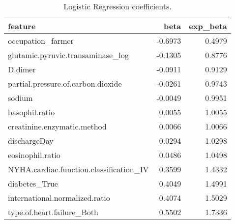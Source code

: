 \begin{table}
\centering
\caption{Logistic Regression coefficients.}
\label{tab:lr-coeff}
\begin{tabular}{lrr}
\toprule
                                feature &    beta &  exp\_beta \\
\midrule
                      occupation\_farmer & -0.6973 &    0.4979 \\
      glutamic.pyruvic.transaminase\_log & -0.1305 &    0.8776 \\
                                D.dimer & -0.0911 &    0.9129 \\
     partial.pressure.of.carbon.dioxide & -0.0261 &    0.9743 \\
                                 sodium & -0.0049 &    0.9951 \\
                         basophil.ratio &  0.0055 &    1.0055 \\
            creatinine.enzymatic.method &  0.0066 &    1.0066 \\
                           dischargeDay &  0.0294 &    1.0298 \\
                       eosinophil.ratio &  0.0486 &    1.0498 \\
NYHA.cardiac.function.classification\_IV &  0.3599 &    1.4332 \\
                          diabetes\_True &  0.4049 &    1.4991 \\
         international.normalized.ratio &  0.4074 &    1.5029 \\
             type.of.heart.failure\_Both &  0.5502 &    1.7336 \\
\bottomrule
\end{tabular}
\end{table}
